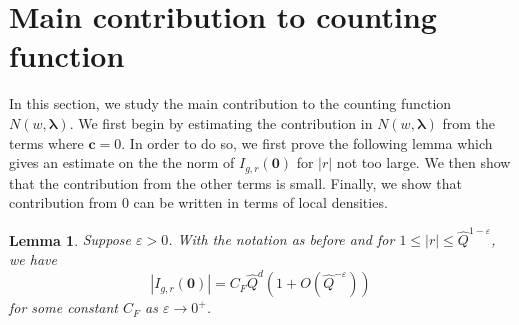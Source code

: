 \documentclass[11pt]{amsart}
\theoremstyle{plain}
\theoremstyle{plain}
\newtheorem{lemma}[theorem]{Lemma}
\renewcommand{\vec}[1]{\mathbf{#1}}
\theoremstyle{remark}
\theoremstyle{definition}
\newcommand{\hQ}{\widehat{Q}}
\begin{document}
\section{Main contribution to counting function}
In this section, we study the main contribution to the counting function $N(w,\boldsymbol{\lambda})$. We first begin by estimating the contribution in $N(w,\boldsymbol{\lambda})$ from the terms where $\vec{c}=0$. In order to do so, we first prove the following lemma which gives an estimate on the the norm of $I_{g,r}(\vec{0})$ for $|r|$ not too large. We then show that the contribution from the other terms is small. Finally, we show that contribution from $0$ can be written in terms of local densities.
\begin{lemma}\label{lem:Izerobound}Suppose $\varepsilon>0$. With the notation as before and for $1\leq |r|\leq\hQ^{1-\varepsilon}$, we have
\[|I_{g,r}(\vec{0})|= C_F\hQ^d(1+O(\hQ^{-\varepsilon}))\]
for some constant $C_F$ as $\varepsilon\rightarrow 0^+$.
\end{lemma}
\end{document}
